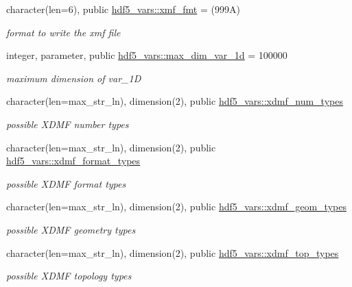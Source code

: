 \begin{DoxyCompactItemize}
\item 
character(len=6), public \hyperlink{namespacehdf5__vars_ad8665a0387dde737161d1162565aefa9}{hdf5\+\_\+vars\+::xmf\+\_\+fmt} = \textquotesingle{}(999\+A)\textquotesingle{}
\begin{DoxyCompactList}\small\item\em format to write the xmf file \end{DoxyCompactList}\item 
integer, parameter, public \hyperlink{namespacehdf5__vars_a69c36b36ad7f55ff124ebc328d18adb7}{hdf5\+\_\+vars\+::max\+\_\+dim\+\_\+var\+\_\+1d} = 100000
\begin{DoxyCompactList}\small\item\em maximum dimension of var\+\_\+1D \end{DoxyCompactList}\item 
character(len=max\+\_\+str\+\_\+ln), dimension(2), public \hyperlink{namespacehdf5__vars_ad8c38b66b3e9b402f05e7e7a36415fb3}{hdf5\+\_\+vars\+::xdmf\+\_\+num\+\_\+types}
\begin{DoxyCompactList}\small\item\em possible X\+D\+MF number types \end{DoxyCompactList}\item 
character(len=max\+\_\+str\+\_\+ln), dimension(2), public \hyperlink{namespacehdf5__vars_ab9c0d2270239bf1963c6294ab7198f8c}{hdf5\+\_\+vars\+::xdmf\+\_\+format\+\_\+types}
\begin{DoxyCompactList}\small\item\em possible X\+D\+MF format types \end{DoxyCompactList}\item 
character(len=max\+\_\+str\+\_\+ln), dimension(2), public \hyperlink{namespacehdf5__vars_acabe6ee64c1612c30ab37774678238e5}{hdf5\+\_\+vars\+::xdmf\+\_\+geom\+\_\+types}
\begin{DoxyCompactList}\small\item\em possible X\+D\+MF geometry types \end{DoxyCompactList}\item 
character(len=max\+\_\+str\+\_\+ln), dimension(2), public \hyperlink{namespacehdf5__vars_ad25ea0a5a9a4bb3f9248a7fa61ea1363}{hdf5\+\_\+vars\+::xdmf\+\_\+top\+\_\+types}
\begin{DoxyCompactList}\small\item\em possible X\+D\+MF topology types \end{DoxyCompactList}\item 

\end{DoxyCompactItemize}

